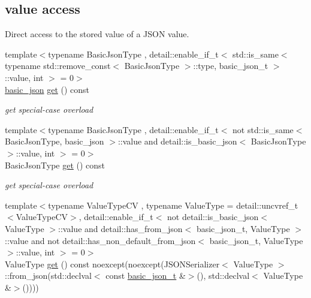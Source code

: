 \subsection*{value access}
\label{_amgrpd8f53c9caf18314e5b3f758245606995}%
Direct access to the stored value of a J\+S\+ON value. \begin{DoxyCompactItemize}
\item 
{\footnotesize template$<$typename Basic\+Json\+Type , detail\+::enable\+\_\+if\+\_\+t$<$ std\+::is\+\_\+same$<$ typename std\+::remove\+\_\+const$<$ Basic\+Json\+Type $>$\+::type, basic\+\_\+json\+\_\+t $>$\+::value, int $>$  = 0$>$ }\\\mbox{\hyperlink{classnlohmann_1_1basic__json}{basic\+\_\+json}} \mbox{\hyperlink{classnlohmann_1_1basic__json_a6b187a22994c12c8cae0dd5ee99dc85e}{get}} () const
\begin{DoxyCompactList}\small\item\em get special-\/case overload \end{DoxyCompactList}\item 
{\footnotesize template$<$typename Basic\+Json\+Type , detail\+::enable\+\_\+if\+\_\+t$<$ not std\+::is\+\_\+same$<$ Basic\+Json\+Type, basic\+\_\+json $>$\+::value and detail\+::is\+\_\+basic\+\_\+json$<$ Basic\+Json\+Type $>$\+::value, int $>$  = 0$>$ }\\Basic\+Json\+Type \mbox{\hyperlink{classnlohmann_1_1basic__json_a30ff63a4d671eb14f652356cd934320c}{get}} () const
\begin{DoxyCompactList}\small\item\em get special-\/case overload \end{DoxyCompactList}\item 
{\footnotesize template$<$typename Value\+Type\+CV , typename Value\+Type  = detail\+::uncvref\+\_\+t$<$\+Value\+Type\+C\+V$>$, detail\+::enable\+\_\+if\+\_\+t$<$ not detail\+::is\+\_\+basic\+\_\+json$<$ Value\+Type $>$\+::value and detail\+::has\+\_\+from\+\_\+json$<$ basic\+\_\+json\+\_\+t, Value\+Type $>$\+::value and not detail\+::has\+\_\+non\+\_\+default\+\_\+from\+\_\+json$<$ basic\+\_\+json\+\_\+t, Value\+Type $>$\+::value, int $>$  = 0$>$ }\\Value\+Type \mbox{\hyperlink{classnlohmann_1_1basic__json_a16f9445f7629f634221a42b967cdcd43}{get}} () const noexcept(noexcept(J\+S\+O\+N\+Serializer$<$ Value\+Type $>$\+::from\+\_\+json(std\+::declval$<$ const \mbox{\hyperlink{classnlohmann_1_1basic__json_afff7860310ae69f29f8158a77ec0ef13}{basic\+\_\+json\+\_\+t}} \&$>$(), std\+::declval$<$ Value\+Type \&$>$())))

\end{DoxyCompactItemize}
